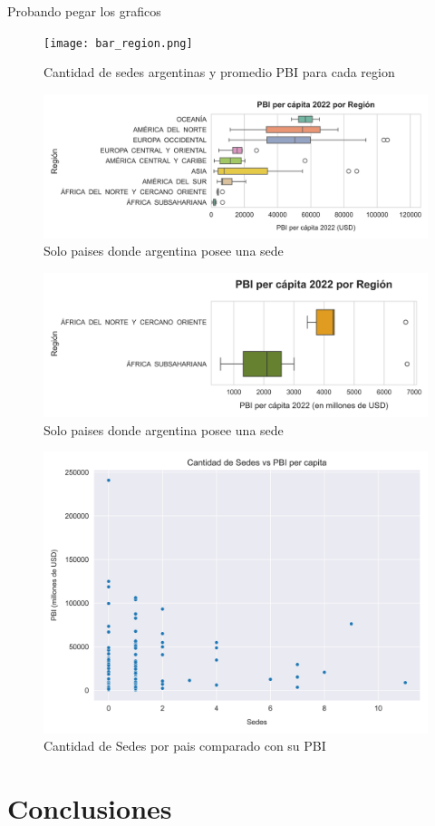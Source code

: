 \documentclass[10pt,a4paper]{article}
\begin{document}
Probando pegar los graficos

\begin{figure}[h]
  \centering
  \texttt{[image: bar\_region.png]}
  \caption{ Cantidad de sedes argentinas y promedio PBI para  cada region}
  \label{fig: Grafico 1}
\end{figure} 

\begin{figure}[h]
  \centering
  \includegraphics[width=1.0\textwidth]{boxplot_regiones.png}
  \caption{Solo paises donde argentina posee una sede}
  \label{fig: Grafico 2}
\end{figure} 

\begin{figure}[h]
  \centering
  \includegraphics[width=1.0\textwidth]{boxplot_ultimas.png}
  \caption{Solo paises donde argentina posee una sede}
  \label{fig: Grafico 3}
\end{figure} 

\begin{figure}[h]
  \centering
  \includegraphics[width=1.0\textwidth]{plot_pbi.png}
  \caption{ Cantidad de Sedes por pais comparado con su PBI}
  \label{fig: Grafico 4}
\end{figure} 

\newpage

\section{Conclusiones}
\end{document}
